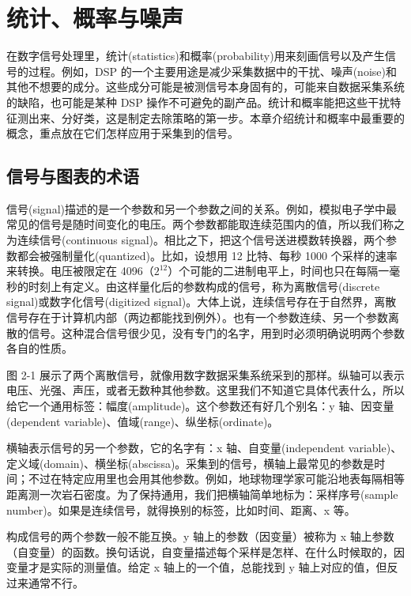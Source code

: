 
\chapter{统计、概率与噪声}\label{ch-02}

在数字信号处理里，统计(statistics)和概率(probability)用来刻画信号以及产生信号的过程。例如，DSP
的一个主要用途是减少采集数据中的干扰、噪声(noise)和其他不想要的成分。这些成分可能是被测信号本身固有的，可能来自数据采集系统的缺陷，也可能是某种
DSP
操作不可避免的副产品。统计和概率能把这些干扰特征测出来、分好类，这是制定去除策略的第一步。本章介绍统计和概率中最重要的概念，重点放在它们怎样应用于采集到的信号。

\section{信号与图表的术语}

信号(signal)描述的是一个参数和另一个参数之间的关系。例如，模拟电子学中最常见的信号是随时间变化的电压。两个参数都能取连续范围内的值，所以我们称之为连续信号(continuous
signal)。相比之下，把这个信号送进模数转换器，两个参数都会被强制量化(quantized)。比如，设想用
12 比特、每秒 1000 个采样的速率来转换。电压被限定在
4096（\(2^{12}\)）个可能的二进制电平上，时间也只在每隔一毫秒的时刻上有定义。由这样量化后的参数构成的信号，称为离散信号(discrete
signal)或数字化信号(digitized
signal)。大体上说，连续信号存在于自然界，离散信号存在于计算机内部（两边都能找到例外）。也有一个参数连续、另一个参数离散的信号。这种混合信号很少见，没有专门的名字，用到时必须明确说明两个参数各自的性质。

图 2-1
展示了两个离散信号，就像用数字数据采集系统采到的那样。纵轴可以表示电压、光强、声压，或者无数种其他参数。这里我们不知道它具体代表什么，所以给它一个通用标签：幅度(amplitude)。这个参数还有好几个别名：y
轴、因变量(dependent variable)、值域(range)、纵坐标(ordinate)。

横轴表示信号的另一个参数，它的名字有：x 轴、自变量(independent
variable)、定义域(domain)、横坐标(abscissa)。采集到的信号，横轴上最常见的参数是时间；不过在特定应用里也会用其他参数。例如，地球物理学家可能沿地表每隔相等距离测一次岩石密度。为了保持通用，我们把横轴简单地标为：采样序号(sample
number)。如果是连续信号，就得换别的标签，比如时间、距离、x 等。

构成信号的两个参数一般不能互换。y 轴上的参数（因变量）被称为 x
轴上参数（自变量）的函数。换句话说，自变量描述每个采样是怎样、在什么时候取的，因变量才是实际的测量值。给定
x 轴上的一个值，总能找到 y 轴上对应的值，但反过来通常不行。

